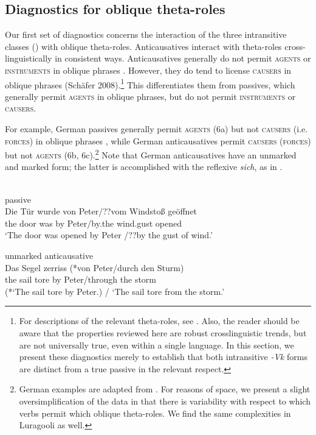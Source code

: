 \documentclass[output=paper]{langsci/langscibook}
\begin{document}
\subsection{Diagnostics for oblique theta-roles} %

Our first set of diagnostics concerns the interaction of the three intransitive classes () with oblique theta-roles. Anticausatives interact with theta-roles cross-linguistically in consistent ways. Anticausatives generally do not permit \textsc{agents} or \textsc{instruments} in oblique phrases \citep{Levin1995}. However, they do tend to license \textsc{causers} in oblique phrases (Schäfer 2008).\footnote{For descriptions of the relevant theta-roles, see \citet{Levin1995}. Also, the reader should be aware that the properties reviewed here are robust crosslinguistic trends, but are not universally true, even within a single language. In this section, we present these diagnostics merely to establish that both intransitive \textit{-Vk} forms are distinct from a true passive in the relevant respect.} This differentiates them from passives, which generally permit \textsc{agents} in oblique phrases, but do not permit \textsc{instruments} or \textsc{causers}.

For example, German passives generally permit \textsc{agents (6}a) but not \textsc{causers (}i.e. \textsc{forces}) in oblique phrases , while German anticausatives permit \textsc{causers} (\textsc{forces}) but not \textsc{agents} (6b, 6c).\footnote{{} German examples are adapted from \citet{Schäfer2008}. For reasons of space, we present a slight oversimplification of the data in that there is variability with respect to which verbs permit which oblique theta-roles. We find the same complexities in Luragooli as well.}\textsuperscript{}  Note that German anticausatives have an unmarked and marked form; the latter is accomplished with the reflexive \textit{sich}, as in .

\ea\label{ex:gluckman:6} 
\\
\ea\label{ex:gluckman:6a}
{{passive}}\\
\gll   Die Tür wurde von Peter/??vom      Windstoß  geöffnet\\
       the door was    by   Peter/by.the  wind.gust   opened\\
\glt ‘The door was opened by Peter /??by the gust of wind.’

\ex\label{ex:gluckman:6b}
{{unmarked anticausative}}\\
\gll   Das Segel zerriss (*von Peter/durch den Sturm)\\
       the  sail    tore        by    Peter/through the storm\\
\glt (*‘The sail tore by Peter.) / ‘The sail tore from the storm.’
\end{document}
